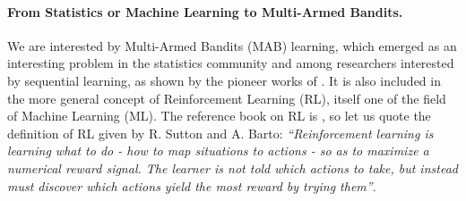 \paragraph{From Statistics or Machine Learning to Multi-Armed Bandits.}
%
We are interested by Multi-Armed Bandits (MAB) learning,
which emerged as an interesting problem in the statistics community and among researchers interested by sequential learning, as shown by the pioneer works of \cite{Thompson33,Robbins52,LaiRobbins85}.
It is also included in the more general concept of Reinforcement Learning (RL), itself one of the field of Machine Learning (ML).
%
The reference book on RL is \cite{SuttonBarto2018}, so let us quote the definition of RL given by R. Sutton and A. Barto:
\emph{``Reinforcement learning is learning what to do - how to map situations to actions - so
as to maximize a numerical reward signal. The learner is not told which actions to
take, but instead must discover which actions yield the most reward by trying them''}.






